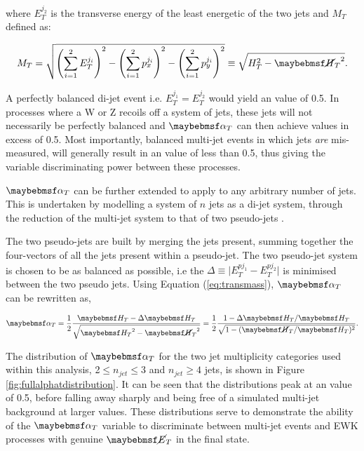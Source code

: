 where $E^{j_{2}}_{T}$ is the transverse energy of the least energetic of the two jets and $M_{T}$ defined as:

\begin{equation}
\label{eq:transmass}
M_{T} = \sqrt{\left(\sum^{2}_{i=1}E^{j_{i}}_{T}\right)^{2}-\left(\sum^{2}_{i=1}p^{j_{i}}_{x}\right)^{2}-\left(\sum^{2}_{i=1}p^{j_{i}}_{y}\right)^{2}} \equiv \sqrt{H_{T}^{2} - \mht^{2}} .
\end{equation}

A perfectly balanced di-jet event i.e. $E_{T}^{j_{1}} = E_{T}^{j_{2}}$ would yield an \alphat value of 0.5. In processes where a W or Z recoils off a system of jets, these jets will not necessarily be perfectly balanced and $\alphat$ can then achieve values in excess of 0.5. Most importantly, balanced multi-jet events in which jets \emph{are} mis-measured, will generally result in an \alphat value of less than 0.5, thus giving the \alphat variable discriminating power between these processes.

$\alphat$ can be further extended to apply to any arbitrary number of jets. This is undertaken by modelling a system of $n$ jets as a di-jet system, through the reduction of the multi-jet system to that of two pseudo-jets \cite{CMS-PAS-SUS-09-001}. 

The two pseudo-jets are built by merging the jets present, summing together the four-vectors of all the jets present within a pseudo-jet. The two pseudo-jet system is chosen to be as balanced as possible, i.e the $\Delta$\theht $\equiv \lvert E_{T}^{pj_{1}} - E_{T}^{pj_{2}}\rvert$ is minimised between the two pseudo jets. Using Equation (\ref{eq:transmass}), $\alphat$ can be rewritten as,

\begin{equation}
\label{eq:alphatmht}
\alphat = \frac{1}{2} \frac {\theht - \Delta\theht}{\sqrt{\theht^{2}-\mht^{2}}}= \frac{1}{2}\frac{1-\Delta\theht/\theht}{\sqrt{1-(\mht/\theht)^{2}}}.
\end{equation}

The distribution of $\alphat$ for the two jet multiplicity categories used within this analysis, 2$\leq n_{jet} \leq$3 and $ n_{jet} \geq 4$ jets, is shown in Figure \ref{fig:fullalphatdistribution}. It can be seen that the distributions peak at an \alphat value of 0.5, before falling away sharply and being free of a simulated multi-jet background at larger \alphat values. These distributions serve to demonstrate the ability of the $\alphat$ variable to discriminate between multi-jet events and \ac{EWK} processes with genuine $\met$ in the final state. 

